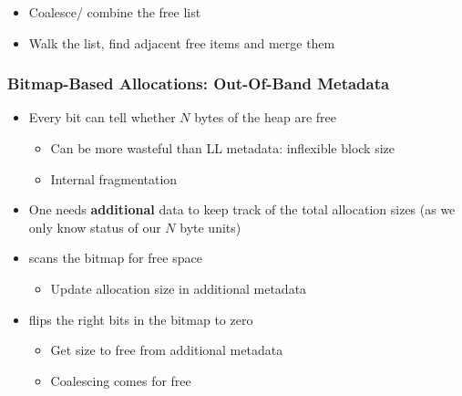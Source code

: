\newpar{}

\begin{itemize}
    \item Coalesce/ combine the free list
    \item Walk the list, find adjacent free items and merge them
\end{itemize}

\subsubsection[Bitmap-Based Allocations]{Bitmap-Based Allocations: Out-Of-Band Metadata}
\begin{itemize}
    \item Every bit can tell whether $N$ bytes of the heap are free
          \begin{itemize}
              \item Can be more wasteful than LL metadata: inflexible block size
              \item Internal fragmentation    %
          \end{itemize}
    \item One needs \textbf{additional} data to keep track of the total allocation sizes (as we only know status of our $N$ byte units)
    \item {} scans the bitmap for free space %
          \begin{itemize}
              \item Update allocation size in additional metadata
          \end{itemize}
    \item {} flips the right bits in the bitmap to zero %
          \begin{itemize}
              \item Get size to free from additional metadata
              \item Coalescing comes for free
          \end{itemize}
\end{itemize}

\newpar{}

